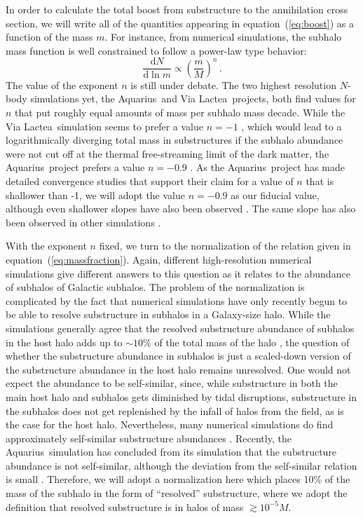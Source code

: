 \documentclass[aps,prd,twocolumn,amsmath,amssymb,floatfix,nofootinbib,10pt]{revtex4}
\newcommand{\VL}{Via Lactea}
\newcommand{\aquarius}{Aquarius}
\newcommand{\dd}{\mathrm{d}}
\newcommand{\eqnname}{equation}
\begin{document}
In order to calculate the total boost from substructure to the
annihilation cross section, we will write all of the quantities
appearing in \eqnname\ (\ref{eq:boost}) as a function of the mass
$m$. For instance, from numerical simulations, the subhalo mass
function is well constrained to follow a power-law type behavior:
\begin{equation}\label{eq:massfraction}
\frac{\dd N}{\dd \ln m}
\propto \left(\frac{m}{M}\right)^n\, .
\end{equation}
The value of the exponent $n$ is still under debate. The two highest
resolution $N$-body simulations yet, the \aquarius\ and \VL\
projects, both find values for $n$ that put roughly equal amounts of
mass per subhalo mass decade. While the \VL\ simulation seems to
prefer a value $n = -1$
\cite{2006ApJ...649....1D,2008ApJ...686..262K}, which would lead to a
logarithmically diverging total mass in substructures if the subhalo
abundance were not cut off at the thermal free-streaming limit of the
dark matter, the \aquarius\ project prefers a value $n = -0.9$
\cite{2008MNRAS.391.1685S}. As the \aquarius\ project has made
detailed convergence studies that support their claim for a value of
$n$ that is shallower than -1, we will adopt the value $n = -0.9$ as
our fiducial value, although even shallower slopes have also been
observed \cite{2002PhRvD..66f3502H}. The same slope has also been
observed in other simulations \cite{2004MNRAS.355..819G}.

With the exponent $n$ fixed, we turn to the normalization of the
relation given in \eqnname\ (\ref{eq:massfraction}). Again, different
high-resolution numerical simulations give different answers to this
question as it relates to the abundance of subhalos of Galactic
subhalos. The problem of the normalization is complicated by the fact
that numerical simulations have only recently begun to be able to
resolve substructure in subhalos in a Galaxy-size halo. While the
simulations generally agree that the resolved substructure abundance
of subhalos in the host halo adds up to $\sim\!10$\% of the total mass
of the halo
\cite{1998MNRAS.300..146G,1999ApJ...522...82K,2004MNRAS.353..624D,2003ApJ...598...49Z,2007ApJ...657..262D,2007ApJ...667..859D},
the question of whether the substructure abundance in subhalos is just
a scaled-down version of the substructure abundance in the host halo
remains unresolved. One would not expect the abundance to be
self-similar, since, while substructure in both the main host halo and
subhalos gets diminished by tidal disruptions, substructure in the
subhalos does not get replenished by the infall of halos from the
field, as is the case for the host halo. Nevertheless, many numerical
simulations do find approximately self-similar substructure abundances
\cite{1999ApJ...524L..19M,2007ApJ...659.1082S}. Recently, the
\aquarius\ simulation has concluded from its simulation that the
substructure abundance is not self-similar, although the deviation
from the self-similar relation is small
\cite{2008MNRAS.391.1685S}. Therefore, we will adopt a normalization
here which places 10\% of the mass of the subhalo in the form of
``resolved'' substructure, where we adopt the definition that resolved
substructure is in halos of mass $\gtrsim 10^{-5} M$.
\end{document}
